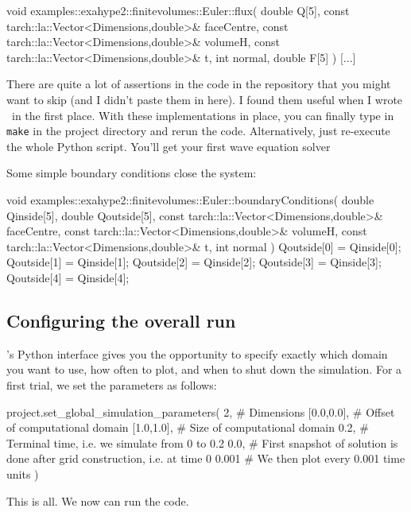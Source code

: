 

\begin{code}
void examples::exahype2::finitevolumes::Euler::flux(
  double                                       Q[5],
  const tarch::la::Vector<Dimensions,double>&  faceCentre,
  const tarch::la::Vector<Dimensions,double>&  volumeH,
  const tarch::la::Vector<Dimensions,double>&  t,
  int                                          normal,
  double                                       F[5]
) {
  [...]
}
\end{code}


\noindent
There are quite a lot of assertions in the code in the repository that you might
want to skip (and I didn't paste them in here).
I found them useful when I wrote \ExaHyPE\ in the first place.
With these implementations in place, you can finally type in \texttt{make} in
the project directory and rerun the code.
Alternatively, just re-execute the whole Python script.
You'll get your first wave equation solver

Some simple boundary conditions close the system:

\begin{code}
void examples::exahype2::finitevolumes::Euler::boundaryConditions(
  double                                       Qinside[5],
  double                                       Qoutside[5],
  const tarch::la::Vector<Dimensions,double>&  faceCentre,
  const tarch::la::Vector<Dimensions,double>&  volumeH,
  const tarch::la::Vector<Dimensions,double>&  t,
  int                                          normal
) {
  Qoutside[0] = Qinside[0];
  Qoutside[1] = Qinside[1];
  Qoutside[2] = Qinside[2];
  Qoutside[3] = Qinside[3];
  Qoutside[4] = Qinside[4];
}
\end{code}



\subsection{Configuring the overall run}

\ExaHyPE's Python interface gives you the opportunity to specify exactly which
domain you want to use, how often to plot, and when to shut down the simulation.
For a first trial, we set the parameters as follows:
\begin{code}
project.set_global_simulation_parameters(
  2,         # Dimensions
  [0.0,0.0], # Offset of computational domain
  [1.0,1.0], # Size of computational domain
  0.2,       # Terminal time, i.e. we simulate from 0 to 0.2
  0.0,       # First snapshot of solution is done after grid construction, i.e. at time 0
  0.001      # We then plot every 0.001 time units
)
\end{code}
\noindent
This is all. We now can run the code.


